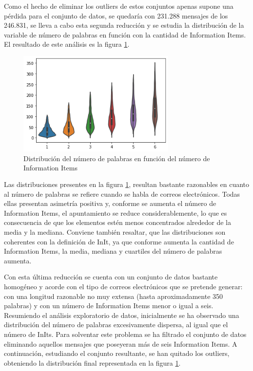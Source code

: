 Como el hecho de eliminar los outliers de estos conjuntos apenas supone una pérdida para el conjunto de datos, se quedaría con 231.288 mensajes de los 246.831, se lleva a cabo esta segunda reducción y se estudia la distribución de la variable de número de palabras en función con la cantidad de Information Items. El resultado de este análisis es la figura \ref{fig:violin}.

\begin{figure}[h]
	\centering%
	\centerline{\includegraphics[width = 0.7\textwidth]{Imagenes/Bitmap/violininitword.png}}%
	\caption{Distribución del número de palabras en función del número de Information Items}%
	\label{fig:violin}
\end{figure}

Las distribuciones presentes en la figura \ref{fig:violin}, resultan bastante razonables en cuanto al número de palabras se refiere cuando se habla de correos electrónicos. Todas ellas presentan asimetría positiva y, conforme se aumenta el número de Information Items, el apuntamiento se reduce considerablemente, lo que es consecuencia de que los elementos estén menos concentrados alrededor de la media y la mediana. Conviene también resaltar, que las distribuciones son coherentes con la definición de InIt, ya que conforme aumenta la cantidad de Information Items, la media, mediana y cuartiles del número de palabras aumenta.

Con esta última reducción se cuenta con un conjunto de datos bastante homogéneo y acorde con el tipo de correos electrónicos que se pretende generar: con una longitud razonable no muy extensa (hasta aproximadamente 350 palabras) y con un número de Information Items menor o igual a seis. Resumiendo el análisis exploratorio de datos, inicialmente se ha observado una distribución del número de palabras excesivamente dispersa, al igual que el número de InIts. Para solventar este problema se ha filtrado el conjunto de datos eliminando aquellos mensajes que poseyeran más de seis Information Items. A continuación, estudiando el conjunto resultante, se han quitado los outliers, obteniendo la distribución final representada en la figura \ref{fig:violin}.